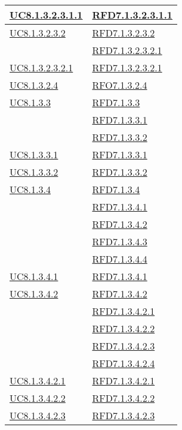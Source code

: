 \begin{longtable}{|>{\centering}m{5cm}|m{5cm}<{\centering}|}
\hyperref[UC8.1.3.2.3.1.1]{UC8.1.3.2.3.1.1} & \hyperlink{RFD7.1.3.2.3.1.1}{RFD7.1.3.2.3.1.1}\\ \hline
\hyperref[UC8.1.3.2.3.2]{UC8.1.3.2.3.2} & \hyperlink{RFD7.1.3.2.3.2}{RFD7.1.3.2.3.2}\\
& \hyperlink{RFD7.1.3.2.3.2.1}{RFD7.1.3.2.3.2.1}\\ \hline
\hyperref[UC8.1.3.2.3.2.1]{UC8.1.3.2.3.2.1} & \hyperlink{RFD7.1.3.2.3.2.1}{RFD7.1.3.2.3.2.1}\\ \hline
\hyperref[UC8.1.3.2.4]{UC8.1.3.2.4} & \hyperlink{RFO7.1.3.2.4}{RFO7.1.3.2.4}\\ \hline
\hyperref[UC8.1.3.3]{UC8.1.3.3} & \hyperlink{RFD7.1.3.3}{RFD7.1.3.3}\\
& \hyperlink{RFD7.1.3.3.1}{RFD7.1.3.3.1}\\
& \hyperlink{RFD7.1.3.3.2}{RFD7.1.3.3.2}\\ \hline
\hyperref[UC8.1.3.3.1]{UC8.1.3.3.1} & \hyperlink{RFD7.1.3.3.1}{RFD7.1.3.3.1}\\ \hline
\hyperref[UC8.1.3.3.2]{UC8.1.3.3.2} & \hyperlink{RFD7.1.3.3.2}{RFD7.1.3.3.2}\\ \hline
\hyperref[UC8.1.3.4]{UC8.1.3.4} & \hyperlink{RFD7.1.3.4}{RFD7.1.3.4}\\
& \hyperlink{RFD7.1.3.4.1}{RFD7.1.3.4.1}\\
& \hyperlink{RFD7.1.3.4.2}{RFD7.1.3.4.2}\\
& \hyperlink{RFD7.1.3.4.3}{RFD7.1.3.4.3}\\
& \hyperlink{RFD7.1.3.4.4}{RFD7.1.3.4.4}\\ \hline
\hyperref[UC8.1.3.4.1]{UC8.1.3.4.1} & \hyperlink{RFD7.1.3.4.1}{RFD7.1.3.4.1}\\ \hline
\hyperref[UC8.1.3.4.2]{UC8.1.3.4.2} & \hyperlink{RFD7.1.3.4.2}{RFD7.1.3.4.2}\\
& \hyperlink{RFD7.1.3.4.2.1}{RFD7.1.3.4.2.1}\\
& \hyperlink{RFD7.1.3.4.2.2}{RFD7.1.3.4.2.2}\\
& \hyperlink{RFD7.1.3.4.2.3}{RFD7.1.3.4.2.3}\\
& \hyperlink{RFD7.1.3.4.2.4}{RFD7.1.3.4.2.4}\\ \hline
\hyperref[UC8.1.3.4.2.1]{UC8.1.3.4.2.1} & \hyperlink{RFD7.1.3.4.2.1}{RFD7.1.3.4.2.1}\\ \hline
\hyperref[UC8.1.3.4.2.2]{UC8.1.3.4.2.2} & \hyperlink{RFD7.1.3.4.2.2}{RFD7.1.3.4.2.2}\\ \hline
\hyperref[UC8.1.3.4.2.3]{UC8.1.3.4.2.3} & \hyperlink{RFD7.1.3.4.2.3}{RFD7.1.3.4.2.3}\\ \hline

\end{longtable}
